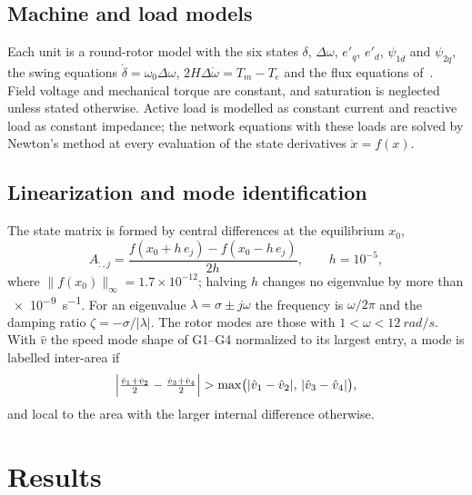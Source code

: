 \documentclass[conference]{IEEEtran}
\begin{document}
\subsection{Machine and load models}
Each unit is a round-rotor model with the six states $\delta$, $\Delta\omega$, $e'_q$, $e'_d$, $\psi_{1d}$ and $\psi_{2q}$, the swing equations $\dot\delta=\omega_0\Delta\omega$, $2H\Delta\dot\omega=T_m-T_e$ and the flux equations of~\cite{kundur}. Field voltage and mechanical torque are constant, and saturation is neglected unless stated otherwise. Active load is modelled as constant current and reactive load as constant impedance; the network equations with these loads are solved by Newton's method at every evaluation of the state derivatives $\dot x=f(x)$.

\subsection{Linearization and mode identification}
The state matrix is formed by central differences at the equilibrium $x_0$,
\begin{equation}
A_{:,j}=\frac{f(x_0+h\,e_j)-f(x_0-h\,e_j)}{2h},\qquad h=10^{-5},
\end{equation}
where $\lVert f(x_0)\rVert_\infty=1.7\times10^{-12}$; halving $h$ changes no eigenvalue by more than \SI{e-9}{s^{-1}}. For an eigenvalue $\lambda=\sigma\pm j\omega$ the frequency is $\omega/2\pi$ and the damping ratio $\zeta=-\sigma/|\lambda|$. The rotor modes are those with $1<\omega<\SI{12}{rad/s}$. With $\hat v$ the speed mode shape of G1--G4 normalized to its largest entry, a mode is labelled inter-area if
\begin{equation}
\Bigl|\tfrac{\hat v_1+\hat v_2}{2}-\tfrac{\hat v_3+\hat v_4}{2}\Bigr|>\max\bigl(|\hat v_1-\hat v_2|,\,|\hat v_3-\hat v_4|\bigr),
\end{equation}
and local to the area with the larger internal difference otherwise.

\section{Results}
\end{document}
